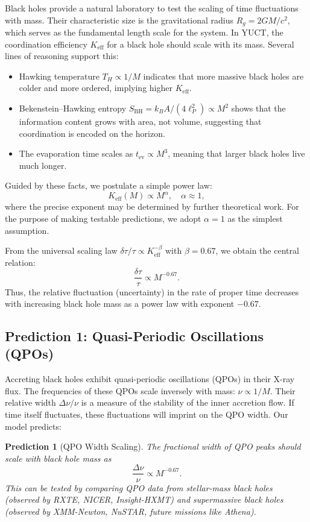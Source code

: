 \documentclass[12pt,a4paper]{article}
\newtheorem{prediction}[theorem]{Prediction}
\newcommand{\Keff}{K_{\mathrm{eff}}}
\begin{document}
	Black holes provide a natural laboratory to test the scaling of time fluctuations with mass. Their characteristic size is the gravitational radius \(R_g = 2GM/c^2\), which serves as the fundamental length scale for the system. In YUCT, the coordination efficiency \(\Keff\) for a black hole should scale with its mass. Several lines of reasoning support this:
	\begin{itemize}
		\item Hawking temperature \(T_H \propto 1/M\) indicates that more massive black holes are colder and more ordered, implying higher \(\Keff\).
		\item Bekenstein–Hawking entropy \(S_{\text{BH}} = k_B A/(4\ell_P^2) \propto M^2\) shows that the information content grows with area, not volume, suggesting that coordination is encoded on the horizon.
		\item The evaporation time scales as \(t_{\text{ev}} \propto M^3\), meaning that larger black holes live much longer.
	\end{itemize}
	Guided by these facts, we postulate a simple power law:
	\begin{equation}
		\Keff(M) \propto M^{\alpha}, \quad \alpha \approx 1,
	\end{equation}
	where the precise exponent may be determined by further theoretical work. For the purpose of making testable predictions, we adopt \(\alpha = 1\) as the simplest assumption.
	
	From the universal scaling law \(\delta \tau / \tau \propto \Keff^{-\beta}\) with \(\beta = 0.67\), we obtain the central relation:
	\begin{equation}
		\boxed{\frac{\delta \tau}{\tau} \propto M^{-0.67}}.
	\end{equation}
	Thus, the relative fluctuation (uncertainty) in the rate of proper time decreases with increasing black hole mass as a power law with exponent \(-0.67\).
	
	\subsection{Prediction 1: Quasi-Periodic Oscillations (QPOs)}
	
	Accreting black holes exhibit quasi-periodic oscillations (QPOs) in their X-ray flux. The frequencies of these QPOs scale inversely with mass: \(\nu \propto 1/M\). Their relative width \(\Delta\nu/\nu\) is a measure of the stability of the inner accretion flow. If time itself fluctuates, these fluctuations will imprint on the QPO width. Our model predicts:
	\begin{prediction}[QPO Width Scaling]
		The fractional width of QPO peaks should scale with black hole mass as
		\begin{equation}
			\frac{\Delta\nu}{\nu} \propto M^{-0.67}.
		\end{equation}
		This can be tested by comparing QPO data from stellar-mass black holes (observed by RXTE, NICER, Insight-HXMT) and supermassive black holes (observed by XMM-Newton, NuSTAR, future missions like Athena).
	\end{prediction}
	
\end{document}

